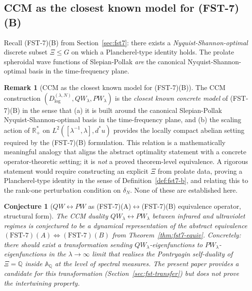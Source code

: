 \documentclass[11pt,a4paper]{article}
\theoremstyle{plain}
\newtheorem{conjecture}[theorem]{Conjecture}
\theoremstyle{definition}
\newtheorem{remark}[theorem]{Remark}
\newcommand{\R}{\mathbb{R}}
\newcommand{\Q}{\mathbb{Q}}
\newcommand{\A}{\mathbb{A}}
\begin{document}
\subsection{CCM as the closest known model for (FST-7)(B)}
\label{sec:ccm-as-fst7b}

Recall (FST-7)(B) from Section~\ref{sec:fst7}: there exists a
\emph{Nyquist-Shannon-optimal} discrete subset $\Xi \le G$ on which
a Plancherel-type identity holds.  The prolate spheroidal wave
functions of Slepian-Pollak \emph{are} the canonical
Nyquist-Shannon-optimal basis in the time-frequency plane.

\begin{remark}[CCM as the closest known model for
(FST-7)(B)]\label{rem:ccm-closest-model}
The CCM construction $(D^{(\lambda,N)}_{\log}, QW_\lambda,
PW_\lambda)$ is the \emph{closest known concrete model} of
(FST-7)(B) in the sense that (a) it is built around the canonical
Slepian-Pollak Nyquist-Shannon-optimal basis in the time-frequency
plane, and (b) the scaling action of $\R_+^\ast$ on
$L^2([\lambda^{-1},\lambda], d^\ast u)$ provides the locally compact
abelian setting required by the (FST-7)(B) formulation.  This
relation is a mathematically meaningful analogy that aligns the
abstract optimality statement with a concrete operator-theoretic
setting; it is \emph{not} a proved theorem-level equivalence.  A
rigorous statement would require constructing an explicit $\Xi$
from prolate data, proving a Plancherel-type identity in the sense
of Definition~\ref{def:fst7-b}, and relating this to the rank-one
perturbation condition on $\delta_N$.  None of these are
established here.
\end{remark}

\begin{conjecture}[$QW\!\leftrightarrow\! PW$ as
(FST-7)(A)$\leftrightarrow$(FST-7)(B) equivalence operator,
structural form]\label{conj:qw-pw-fst7}
The CCM duality $QW_\lambda \leftrightarrow PW_\lambda$ between
infrared and ultraviolet regimes is conjectured to be a dynamical
representation of the abstract equivalence $(\text{FST-7})(A)
\Leftrightarrow (\text{FST-7})(B)$ from
Theorem~\ref{thm:fst7-equiv}.  Concretely: there should exist a
transformation sending $QW_\lambda$-eigenfunctions to
$PW_\lambda$-eigenfunctions in the $\lambda \to \infty$ limit that
realises the Pontryagin self-duality of $\Xi = \Q$ inside $\A_\Q$ at
the level of spectral measures.  The present paper provides a
candidate for this transformation (Section~\ref{sec:fst-transfer})
but does not prove the intertwining property.
\end{conjecture}
\end{document}
